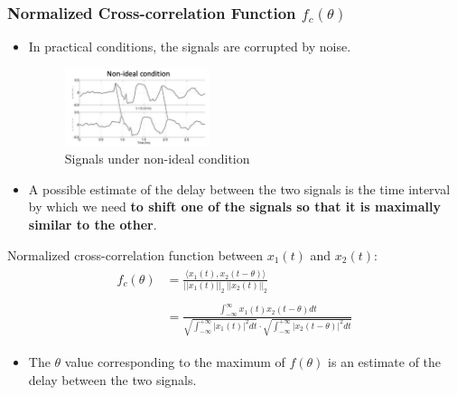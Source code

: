 
 
\subsubsection{Normalized Cross-correlation Function $f_{c}(\theta)$}
\begin{itemize}
 \item In practical conditions, the signals are corrupted by noise. 
  \begin{figure}[H]\centering \includegraphics[width=0.4\textwidth]{images/nonideal}
   \caption{Signals under non-ideal condition} \end{figure}
 \item A possible estimate of the delay between the two signals is the time interval by which we need \textbf{to shift one of the signals
   so that it is maximally similar to the other}.
\end{itemize}

 Normalized cross-correlation function between $x_{1}(t)$ and $x_{2}(t)$:
 \begin{align*}\begin{split}
 f_{c}(\theta) &= \frac{\langle x_{1}(t), x_{2}(t-\theta) \rangle}{ \lvert \lvert x_{1}(t) \rvert \rvert_{2} \ \lvert \lvert x_{2}(t) \rvert \rvert_{2}} \\\\
 &= \frac{\int_{-\infty}^{\infty}  x_{1}(t) x_{2}(t-\theta) dt}{\sqrt{\int_{-\infty}^{+\infty}\lvert x_{1}(t)
 \rvert^{2} dt} \cdot \sqrt{\int_{-\infty}^{+\infty}\lvert x_{2}(t-\theta) \rvert^{2} dt}}
 \end{split} \end{align*}
\begin{itemize}
    \item The $\theta$ value corresponding to the maximum of $f(\theta)$ is an estimate of the delay between the two signals.
 \end{itemize}
 
